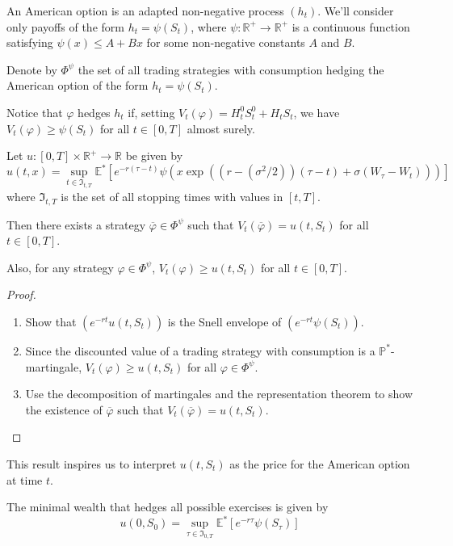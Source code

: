 An American option is an adapted non-negative process $(h_t)$. We'll consider only payoffs of the form $h_t = \psi(S_t)$, where $\psi : \mathbb{R}^+ \longrightarrow \mathbb{R}^+$ is a continuous function satisfying $\psi(x) \le A + Bx$ for some non-negative constants $A$ and $B$. 

Denote by $\Phi^\psi$ the set of all trading strategies with consumption hedging the American option of the form $h_t = \psi(S_t)$.

Notice that $\varphi$ hedges $h_t$ if, setting $V_t(\varphi) = H_t^0 S_t^0 + H_t S_t$, we have $V_t(\varphi) \ge \psi(S_t)$ for all $t \in [0, T]$ almost surely. 

\begin{theorem}
    Let $u : [0, T] \times \mathbb{R}^+ \longrightarrow \mathbb{R}$ be given by 
    \[
        u(t, x) = \sup_{t \in \mathfrak{I}_{t, T}} \mathbb{E}^\ast [e^{-r(\tau - t)} \psi (x \exp ((r - (\sigma^2 /2)) (\tau - t) + \sigma (W_\tau - W_t)))]
    \]
    where $\mathfrak{I}_{t, T}$ is the set of all stopping times with values in $[t, T]$.

    Then there exists a strategy $\overline{\varphi} \in \Phi^\psi$ such that $V_t(\overline{\varphi}) = u(t, S_t)$ for all $t \in [0, T]$. 

    Also, for any strategy $\varphi \in \Phi^\psi$, $V_t(\varphi) \ge u(t, S_t)$ for all $t \in [0, T]$. 
\end{theorem}

\begin{proof}
    \begin{enumerate}
        \item Show that $(e^{-rt} u(t, S_t))$ is the Snell envelope of $(e^{-rt} \psi(S_t))$.
        \item Since the discounted value of a trading strategy with consumption is a $\mathbb{P}^\ast$-martingale, $V_t(\varphi) \ge u(t, S_t)$ for all $\varphi \in \Phi^\psi$.
        \item Use the decomposition of martingales and the representation theorem to show the existence of $\overline{\varphi}$ such that $V_t(\overline{\varphi}) = u(t, S_t)$.
    \end{enumerate}
\end{proof}

This result inspires us to interpret $u(t, S_t)$ as the price for the American option at time $t$.

\begin{remark}
    The minimal wealth that hedges all possible exercises is given by 
    \[
        u(0, S_0) = \sup_{\tau \in \mathfrak{I}_{0, T}} \mathbb{E}^\ast [e^{-r \tau} \psi(S_\tau)]
    \]
\end{remark}

